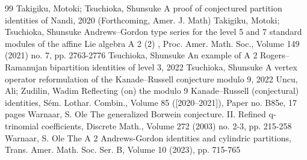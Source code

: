 \documentclass[10pt]{article}
\begin{document}
\begin{thebibliography}{99}
Takigiku, Motoki; Tsuchioka, Shunsuke A proof of conjectured partition identities of Nandi, 2020 (Forthcoming, Amer. J. Math)
Takigiku, Motoki; Tsuchioka, Shunsuke Andrews–Gordon type series for the level 5 and 7 standard modules of the affine Lie algebra A 2 (2) , Proc. Amer. Math. Soc., Volume 149 (2021) no. 7, pp. 2763-2776
Tsuchioka, Shunsuke An example of A 2  Rogers–Ramanujan bipartition identities of level 3, 2022
Tsuchioka, Shunsuke A vertex operator reformulation of the Kanade–Russell conjecture modulo 9, 2022
Uncu, Ali; Zudilin, Wadim Reflecting (on) the modulo 9 Kanade–Russell (conjectural) identities, Sém. Lothar. Combin., Volume 85 ([2020–2021]), Paper no. B85e, 17 pages
Warnaar, S. Ole The generalized Borwein conjecture. II. Refined q-trinomial coefficients, Discrete Math., Volume 272 (2003) no. 2-3, pp. 215-258
Warnaar, S. Ole The A 2  Andrews-Gordon identities and cylindric partitions, Trans. Amer. Math. Soc. Ser. B, Volume 10 (2023), pp. 715-765
\end{thebibliography}
\end{document}
